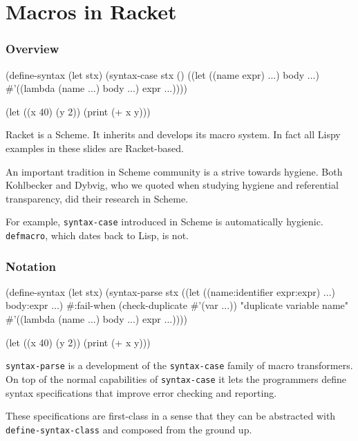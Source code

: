 \documentclass[hyperref={bookmarks=false}]{beamer}
\begin{document}
\section{Macros in Racket}

\begin{frame}[fragile]
\frametitle{Overview}

\begin{lstlistinglike}
\begin{semiverbatim}
(define-syntax (let stx)
  (syntax-case stx ()
    ((let ((name expr) ...) body ...)
     #'((lambda (name ...) body ...) expr ...))))

(let ((x 40) (y 2)) (print (+ x y)))
\end{semiverbatim}
\end{lstlistinglike}

Racket is a Scheme. It inherits and develops its macro system.
In fact all Lispy examples in these slides are Racket-based.

An important tradition in Scheme community is a strive towards hygiene.
Both Kohlbecker and Dybvig, who we quoted when studying hygiene and referential
transparency, did their research in Scheme.

For example, \texttt{syntax-case} introduced in Scheme is automatically hygienic.
\texttt{defmacro}, which dates back to Lisp, is not.
\end{frame}

\begin{frame}[fragile]
\frametitle{Notation}

\begin{lstlistinglike}
\begin{semiverbatim}
(define-syntax (let stx)
  (syntax-parse stx
    ((let ((name\alert{:identifier} expr\alert{:expr}) ...) body\alert{:expr} ...)
     \alert{#:fail-when} (check-duplicate #'(var ...))
                  "duplicate variable name"
     #'((lambda (name ...) body ...) expr ...))))

(let ((x 40) (y 2)) (print (+ x y)))
\end{semiverbatim}
\end{lstlistinglike}

\texttt{syntax-parse} is a development of the \texttt{syntax-case} family of macro transformers.
On top of the normal capabilities of \texttt{syntax-case} it lets the programmers define
syntax specifications that improve error checking and reporting.

These specifications are first-class in a sense that they can be abstracted with \texttt{define-syntax-class} and composed from the ground up.
\end{frame}
\end{document}

